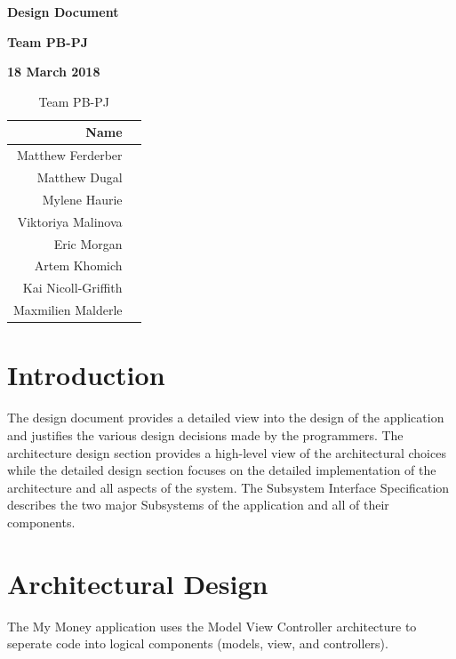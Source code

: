 \documentclass[12pt]{article}
\begin{document}
\vspace*{0.5in}
\centerline{\bf\Large Design Document}

\vspace*{0.5in}
\centerline{\bf\Large Team PB-PJ}

\vspace*{0.5in}
\centerline{\bf\Large 18 March 2018}

\vspace*{1.5in}
\begin{table}[htbp]
\caption{Team PB-PJ}
\begin{center}
\begin{tabular}{|r | c|}
\hline
Name\\
\hline\hline
Matthew Ferderber\\
Matthew Dugal\\
Mylene Haurie\\
Viktoriya Malinova\\
Eric Morgan\\
Artem Khomich\\
Kai Nicoll-Griffith\\
Maxmilien Malderle\\
\hline
\end{tabular}
\end{center}
\end{table}

\clearpage

\section{Introduction}

The design document provides a detailed view into the design of the application
and justifies the various design decisions made by the programmers. The architecture design section
provides a high-level view of the architectural choices while the detailed design section
focuses on the detailed implementation of the architecture and all aspects of the system.
The Subsystem Interface Specification describes the two major Subsystems of the
application and all of their components.

\section{Architectural Design} \label{sec:arch}

The My Money application uses the Model View Controller architecture to seperate code into
logical components (models, view, and controllers).
\end{document}
